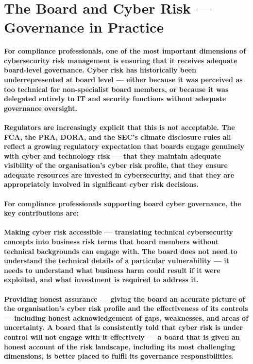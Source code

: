 \section{The Board and Cyber Risk — Governance in Practice}
\paragraph{For compliance professionals, one of the most important dimensions of cybersecurity risk management is ensuring that it receives adequate board-level governance. Cyber risk has historically been underrepresented at board level — either because it was perceived as too technical for non-specialist board members, or because it was delegated entirely to IT and security functions without adequate governance oversight.}
\paragraph{Regulators are increasingly explicit that this is not acceptable. The FCA, the PRA, DORA, and the SEC's climate disclosure rules all reflect a growing regulatory expectation that boards engage genuinely with cyber and technology risk — that they maintain adequate visibility of the organisation's cyber risk profile, that they ensure adequate resources are invested in cybersecurity, and that they are appropriately involved in significant cyber risk decisions.}
\paragraph{For compliance professionals supporting board cyber governance, the key contributions are:}
\paragraph{\textbf{Making cyber risk accessible} — translating technical cybersecurity concepts into business risk terms that board members without technical backgrounds can engage with. The board does not need to understand the technical details of a particular vulnerability — it needs to understand what business harm could result if it were exploited, and what investment is required to address it.}
\paragraph{\textbf{Providing honest assurance} — giving the board an accurate picture of the organisation's cyber risk profile and the effectiveness of its controls — including honest acknowledgement of gaps, weaknesses, and areas of uncertainty. A board that is consistently told that cyber risk is under control will not engage with it effectively — a board that is given an honest account of the risk landscape, including its most challenging dimensions, is better placed to fulfil its governance responsibilities.}
